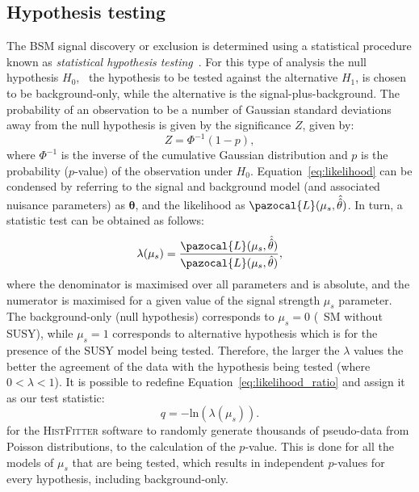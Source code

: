 	\subsection{Hypothesis testing}
	The \ac{BSM} signal discovery or exclusion is determined using a statistical procedure known as \textit{statistical hypothesis testing}~\cite{Cowan2015}. For this type of analysis the null hypothesis $H_0$, \ie\ the hypothesis to be tested against the alternative $H_1$, is chosen to be background-only, while the alternative is the signal-plus-background.
	The probability of an observation to be a number of Gaussian standard deviations away from the null hypothesis is given by the significance $Z$, given by:
	\begin{equation}
	Z=\Phi^{-1}(1-p),
	\label{eq:significance}
	\end{equation}
	where $\Phi^{-1}$ is the inverse of the cumulative Gaussian distribution and $p$ is the probability ($p$-value) of the observation under $H_0$.
	 Equation~\ref{eq:likelihood} can be condensed by referring to the signal and background model (and associated nuisance parameters) as $\bm{\theta}$, and the likelihood as $\pazocal{L}(\mu_s,\hat{\hat{\theta}})$. In turn, a statistic test can be obtained as follows:
	 \begin{equation}
	 \lambda(\mu_s)=\frac{\pazocal{L}(\mu_s,\hat{\hat{\theta}})}{\pazocal{L}(\mu_s,\hat{\theta})},
	\label{eq:likelihood_ratio}	
	 \end{equation}
	 where the denominator is maximised over all parameters and is absolute, and the numerator is maximised for a given value of the signal strength $\mu_s$ parameter. 
	 The background-only (null hypothesis) corresponds to $\mu_s=0$ (\ie\ \ac{SM} without \ac{SUSY}), while $\mu_s=1$ corresponds to alternative hypothesis which is for the presence of the \ac{SUSY} model being tested.
	 Therefore, the larger the $\lambda$ values the better the agreement of the data with the hypothesis being tested (where $0<\lambda<1$). 
	 It is possible to redefine Equation~\ref{eq:likelihood_ratio} and assign it as our test statistic:
	\begin{equation}
	q = -\mathrm{ln}(\lambda(\mu_s)).
	\end{equation}
	for the \textsc{HistFitter} software to randomly generate thousands of pseudo-data from Poisson distributions, to the calculation of the $p$-value. This is done for all the models of $\mu_s$ that are being tested, which results in independent $p$-values for every hypothesis, including background-only. 
	
